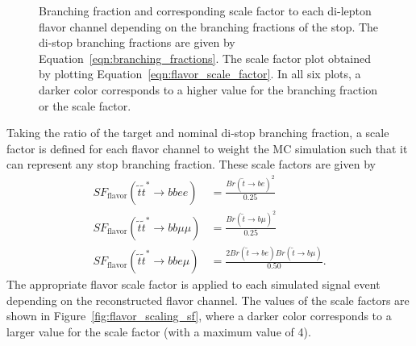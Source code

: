 \begin{figure}[ht]
  \centering
  \caption{
    Branching fraction and corresponding scale factor to each di-lepton
    flavor channel depending on the branching fractions of the stop.
    The di-stop branching fractions are given by
    Equation~\ref{eqn:branching_fractions}.
    The scale factor plot obtained by plotting
    Equation~\ref{eqn:flavor_scale_factor}.
    In all six plots, a darker color corresponds to a higher value for the
    branching fraction or the scale factor.
  }
  \label{fig:flavor_scaling}
\end{figure}

Taking the ratio of the target and nominal di-stop branching fraction, a
scale factor is defined for each flavor channel to weight the MC simulation
such that it can represent any stop branching fraction.
These scale factors are given by
\begin{equation}
  \label{eqn:flavor_scale_factor}
  \begin{aligned}
    SF_\mathrm{flavor}(\tilde{t}\tilde{t}^{*} \rightarrow bbee)     &=
      \frac{Br(\tilde{t} \rightarrow be)^2}{0.25} \\
    SF_\mathrm{flavor}(\tilde{t}\tilde{t}^{*} \rightarrow bb\mu\mu) &=
      \frac{Br(\tilde{t} \rightarrow b\mu)^2}{0.25} \\
    SF_\mathrm{flavor}(\tilde{t}\tilde{t}^{*} \rightarrow bbe\mu)   &=
      \frac{2Br(\tilde{t} \rightarrow be)Br(\tilde{t} \rightarrow b\mu)}{0.50}.
  \end{aligned}
\end{equation}
The appropriate flavor scale factor is applied to each simulated signal event
depending on the reconstructed flavor channel.
The values of the scale factors are shown in Figure~\ref{fig:flavor_scaling_sf},
where a darker color corresponds to a larger value for the scale factor (with a
maximum value of 4).

